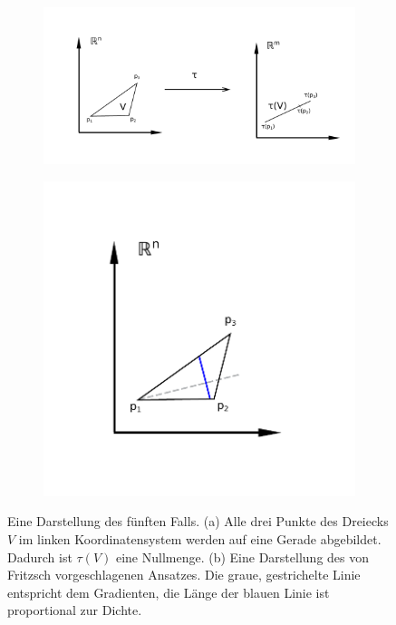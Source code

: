 \documentclass[a4paper,fontsize=12pt,toc=bib,halfparskip,ngerman]{scrartcl}
\begin{document}
\begin{figure}
	\begin{subfigure}{0.66\textwidth}
		\includegraphics[width=\textwidth]{pictures/Case5}
		\subcaption{}
		\label{Case5}
	\end{subfigure}
	\begin{subfigure}{0.33\textwidth}
		\includegraphics[width=\textwidth]{pictures/Case5-Solution}
		\subcaption{}
		\label{Case5Solution}
	\end{subfigure}
	\caption{Eine Darstellung des f\"unften Falls. (a) Alle drei Punkte des Dreiecks $V$ im linken Koordinatensystem werden auf eine Gerade abgebildet. Dadurch ist $\tau(V)$ eine Nullmenge. (b) Eine Darstellung des von Fritzsch vorgeschlagenen Ansatzes. Die graue, gestrichelte Linie entspricht dem Gradienten, die L\"ange der blauen Linie ist proportional zur Dichte. }
\end{figure}
\end{document}
